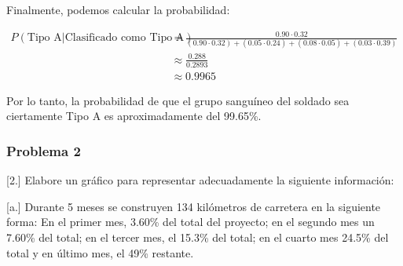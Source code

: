 \documentclass[
]{article}
\begin{document}
Finalmente, podemos calcular la probabilidad:

\[
\begin{align*}
        P(\text{Tipo A}|\text{Clasificado como Tipo A}) &= \frac{0.90 \cdot 0.32}{(0.90 \cdot 0.32) + (0.05 \cdot 0.24) + (0.08 \cdot 0.05) + (0.03 \cdot 0.39)} \\
        &\approx \frac{0.288}{0.2893} \\
        &\approx 0.9965
    \end{align*}
\]

Por lo tanto, la probabilidad de que el grupo sanguíneo del soldado sea
ciertamente Tipo A es aproximadamente del 99.65\%.

\hypertarget{problema-2}{%
\subsubsection{Problema 2}\label{problema-2}}

{[}2.{]} Elabore un gráfico para representar adecuadamente la siguiente
información:

{[}a.{]} Durante 5 meses se construyen 134 kilómetros de carretera en la
siguiente forma: En el primer mes, 3.60\% del total del proyecto; en el
segundo mes un 7.60\% del total; en el tercer mes, el 15.3\% del total;
en el cuarto mes 24.5\% del total y en último mes, el 49\% restante.
\end{document}
